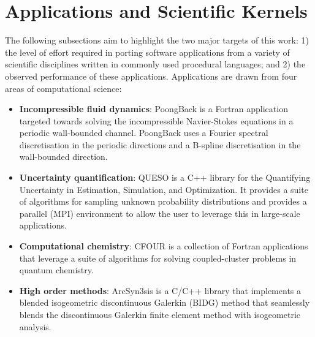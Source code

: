 \section{Applications and Scientific Kernels}
\label{sec:apps}

The following subsections aim to highlight the two major targets of this work: 1) the level of effort
required in porting software applications from a variety of scientific
disciplines written in commonly used procedural languages; and 2) the observed
performance of these applications.  Applications are drawn from four areas
of computational science:
\begin{itemize}
\item {\bf Incompressible fluid dynamics}:  PoongBack is a Fortran application
targeted towards solving the incompressible Navier-Stokes equations in a
periodic wall-bounded channel.  PoongBack uses a Fourier spectral
discretisation in the periodic directions and a B-spline discretisation in the
wall-bounded direction.

\item {\bf Uncertainty quantification}:  QUESO is a C++ library for the
Quantifying Uncertainty in Estimation, Simulation, and Optimization.  It
provides a suite of algorithms for sampling unknown probability distributions
and provides a parallel (MPI) environment to allow the user to leverage this in
large-scale applications.  %

\item {\bf Computational chemistry}:  CFOUR is a collection of Fortran
applications that leverage a suite of algorithms for solving coupled-cluster
problems in quantum chemistry.

\item {\bf High order methods}:  ArcSyn3sis is a C/C++ library that implements
a blended isogeometric discontinuous Galerkin (BIDG) method that seamlessly
blends the discontinuous Galerkin finite element method with isogeometric analysis.

\end{itemize}

%
